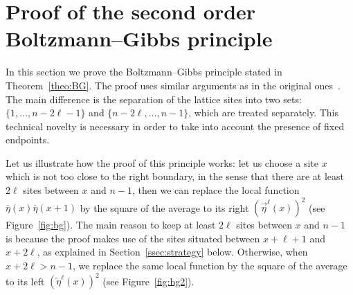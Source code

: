 \documentclass[10pt]{amsart}
\theoremstyle{definition}\newtheorem{defi}[theo]{Definition}\newtheorem{rema}[theo]{Remark}\newtheorem{exam}[theo]{Example}\newtheorem{exem}[theo]{Example}\newtheorem{nota}[theo]{Notation}
\renewcommand\vec[1]{\overrightarrow{#1}}
\newcommand\vecleft[1]{\overleftarrow{#1}}
\renewcommand{\bar}{\overline}
\begin{document}
\section{Proof of the second order Boltzmann--Gibbs principle}\label{sec:proofBG}
\label{s5}

In this section we prove the Boltzmann--Gibbs principle stated in Theorem~\ref{theo:BG}. The proof uses similar arguments as in the original ones~\cite{GJSi,blondel2016,fgsimon2015}. The main difference is the separation of the lattice sites into two sets: $\{1,\dots,n-2\ell-1\}$ and $\{n-2\ell,\dots,n-1\}$, which are treated separately. This technical novelty is necessary in order to take into account the presence of fixed endpoints.

Let us illustrate how the proof of this principle works: let us choose a site $x$ which is not too close to the right boundary, in the sense that there are at least $2\ell$ sites between $x$ and $n-1$, then we can replace the local function $\bar\eta(x)\bar\eta(x+1)$ by the square of the average to its right $(\vec\eta^\ell(x))^2$ (see Figure~\ref{fig:bg}). The main reason to keep at least $2\ell$ sites between $x$ and $n-1$ is because the proof makes use of the sites situated between $x+\ell+1$ and $x+2\ell$, as explained in Section~\ref{ssec:strategy} below. Otherwise, when $x+2\ell > n-1$, we replace the same local function by the square of the average to its left $(\vecleft\eta^\ell(x))^2$ (see Figure~\ref{fig:bg2}).
\end{document}
